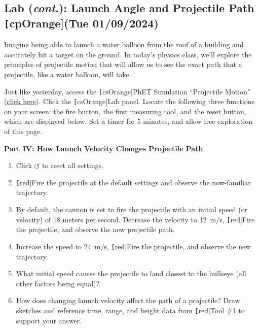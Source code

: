 \documentclass[main-physics.tex]{subfiles}
\begin{document}
\clearpage

\subsection{Lab {\small (\textit{cont}.)}: Launch Angle and Projectile Path \texttt[cpOrange]{(Tue 01/09/2024)}} \label{9UH4Uj}

\begin{hook}
    Imagine being able to launch a water balloon from the roof of a building and accurately hit a target on the ground. In today's physics class, we'll explore the principles of projectile motion that will allow us to see the exact path that a projectile, like a water balloon, will take.
\end{hook}

\begin{warmup}
    Just like yesterday, access the \texttt[csOrange]{PhET Simulation} ``Projectile Motion'' (\href{https://phet.colorado.edu/sims/html/projectile-motion/latest/projectile-motion_all.html}{click here}). Click the \texttt[csOrange]{Lab} panel. Locate the following three functions on your screen: the fire button, the first measuring tool, and the reset button, which are displayed below. Set a timer for 5 minutes, and allow free exploration of this page.
\end{warmup}

\textbf{Part IV: How Launch Velocity Changes Projectile Path}

\begin{enumerate}
    \item Click $\boldsymbol{\circlearrowleft}$ to reset all settings.
    \item \texttt[red]{Fire} the projectile at the default settings and observe the now-familiar trajectory. 
    \item By default, the cannon is set to fire the projectile with an initial speed (or velocity) of 18 meters per second. Decrease the velocity to \SI{12}{m/s}, \texttt[red]{Fire} the projectile, and observe the new projectile path.
    \item Increase the speed to \SI{24}{m/s}, \texttt[red]{Fire} the projectile, and observe the new trajectory.
    \item What initial speed causes the projectile to land closest to the bullseye (all other factors being equal)?
    \item How does changing launch velocity affect the path of a projectile? Draw sketches and reference time, range, and height data from \texttt[red]{Tool \#1} to support your answer.
\end{enumerate}
\end{document}
